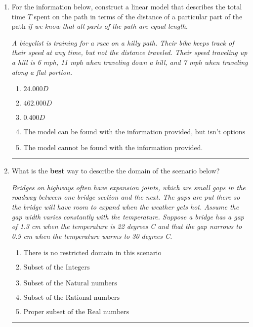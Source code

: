 \documentclass[14pt]{extbook}
\newcommand{\litem}[1]{\item#1\hspace*{-1cm}\rule{\textwidth}{0.4pt}}
\begin{document}
\begin{enumerate}
{\begin{enumerate}[label=\Alph*.]
\end{enumerate} }
\litem{
For the information below, construct a linear model that describes the total time $T$ spent on the path in terms of the distance of a particular part of the path \textit{if we know that all parts of the path are equal length}.
\begin{center}
    \textit{ A bicyclist is training for a race on a hilly path. Their bike keeps track of their speed at any time, but not the distance traveled. Their speed traveling up a hill is 6 mph, 11 mph when traveling down a hill, and 7 mph when traveling along a flat portion. }
\end{center}
\begin{enumerate}[label=\Alph*.]
\item \( 24.000 D \)
\item \( 462.000 D \)
\item \( 0.400 D \)
\item \( \text{The model can be found with the information provided, but isn't options 1-3.} \)
\item \( \text{The model cannot be found with the information provided.} \)

\end{enumerate} }
\litem{
What is the \textbf{best} way to describe the domain of the scenario below?
\begin{center}
    \textit{ Bridges on highways often have expansion joints, which are small gaps in the roadway between one bridge section and the next. The gaps are put there so the bridge will have room to expand when the weather gets hot. Assume the gap width varies constantly with the temperature. Suppose a bridge has a gap of 1.3 cm when the temperature is 22 degrees C and that the gap narrows to 0.9 cm when the temperature warms to 30 degrees C. }
\end{center}
\begin{enumerate}[label=\Alph*.]
\item \( \text{There is no restricted domain in this scenario} \)
\item \( \text{Subset of the Integers} \)
\item \( \text{Subset of the Natural numbers} \)
\item \( \text{Subset of the Rational numbers} \)
\item \( \text{Proper subset of the Real numbers} \)

\end{enumerate} }
\end{enumerate}
\end{document}
